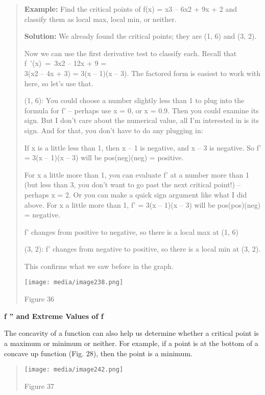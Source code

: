 \begin{quote}
\textbf{Example:} Find the critical points of f(x) = x3 -- 6x2 + 9x + 2
and classify them as local max, local min, or neither.

\textbf{Solution:} We already found the critical points; they are (1, 6)
and (3, 2).

Now we can use the first derivative test to classify each. Recall that
f~'(x)~=~3x2 -- 12x + 9 =\\
3(x2 -- 4x + 3) = 3(x -- 1)(x -- 3). The factored form is easiest to
work with here, so let's use that.

(1, 6): You could choose a number slightly less than 1 to plug into the
formula for f' -- perhaps use x = 0, or x = 0.9. Then you could examine
its sign. But I don't care about the numerical value, all I'm interested
in is its sign. And for that, you don't have to do any plugging in:

If x is a little less than 1, then x -- 1 is negative, and x -- 3 is
negative. So f' = 3(x -- 1)(x -- 3) will be pos(neg)(neg) = positive.

For x a little more than 1, you can evaluate f' at a number more than 1
(but less than 3, you don't want to go past the next critical point!) --
perhaps x = 2. Or you can make a quick sign argument like what I did
above. For x a little more than 1, f' = 3(x -- 1)(x -- 3) will be
pos(pos)(neg) = negative.

f' changes from positive to negative, so there is a local max at (1, 6)

(3, 2): f' changes from negative to positive, so there is a local min at
(3, 2).

This confirms what we saw before in the graph.

\texttt{[image: media/image238.png]}

Figure 36
\end{quote}

\textbf{f '' and Extreme Values of f}

The concavity of a function can also help us determine whether a
critical point is a maximum or minimum or neither. For example, if a
point is at the bottom of a concave up function (Fig. 28), then the
point is a minimum.

\begin{quote}
\texttt{[image: media/image242.png]}

Figure 37
\end{quote}

